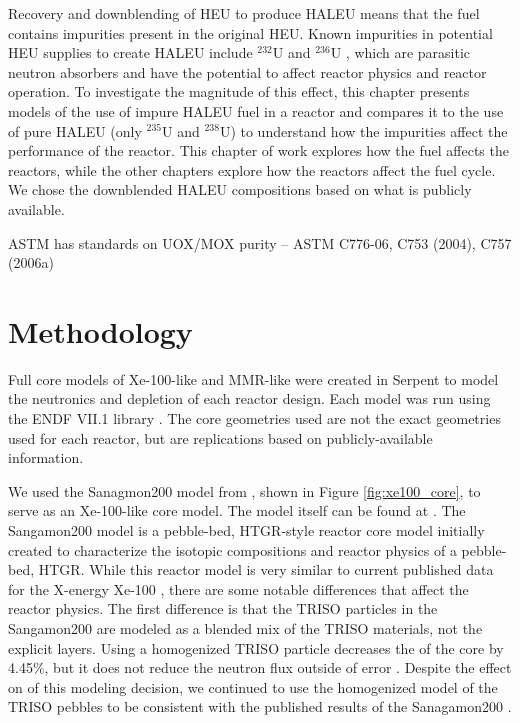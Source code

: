 Recovery and downblending of \gls{HEU} to produce \gls{HALEU} means that 
the fuel contains impurities present in the original
\gls{HEU}. Known impurities in potential \gls{HEU}
supplies to create \gls{HALEU} include $^{232}$U and $^{236}$U
\cite{vaden_isotopic_2018,nelson_foreign_2010},  
which are parasitic neutron absorbers and have the potential to affect 
reactor physics and reactor operation. To investigate the magnitude of this 
effect, this chapter presents models of the use of 
impure \gls{HALEU} fuel in a reactor and compares it to the use of pure 
\gls{HALEU} (only $^{235}$U and $^{238}$U)
to understand how the impurities affect the performance of the reactor.
This chapter of work explores how the fuel affects the reactors, while 
the other chapters explore how the reactors affect the fuel cycle. We chose 
the downblended \gls{HALEU} compositions based on what is publicly 
available. 




ASTM has standards on UOX/MOX purity -- ASTM C776-06, C753 (2004), C757 (2006a)

\section{Methodology}
Full core models of Xe-100-like and \gls{MMR}-like were created in Serpent 
\cite{leppanen_serpent_2014} to model the neutronics and depletion of 
each reactor design. Each model was run using the ENDF VII.1 library
\cite{chadwick_endfb-vii1_2011}. The core geometries used are not 
the exact geometries used for each reactor, but are replications based 
on publicly-available information. 

We used the Sanagmon200 model from \cite{richter_isotopic_2022}, shown in 
Figure \ref{fig:xe100_core}, to serve as an Xe-100-like 
core model. The model itself can be found at \cite{richter_zoerichterphlox_2022}.
The Sangamon200 model is a pebble-bed, \gls{HTGR}-style reactor core model 
initially created to characterize the isotopic compositions and 
reactor physics of a pebble-bed, \gls{HTGR}. While this reactor model 
is very similar to current published data for the X-energy Xe-100
\cite{mulder_overview_2021}, there are some notable differences that affect 
the reactor physics. The first difference is that the \gls{TRISO} particles 
in the Sangamon200 are modeled as a blended mix of the \gls{TRISO} 
materials, not the explicit layers. Using a homogenized \gls{TRISO} particle 
decreases the \keff of the core by 4.45\%, but it does not reduce the 
neutron flux outside of error \cite{richter_isotopic_2022}. Despite 
the effect on \keff of this modeling decision, we continued to use the 
homogenized model of the \gls{TRISO} pebbles to be consistent with the 
published results of the Sanagamon200 \cite{richter_isotopic_2022}. 

